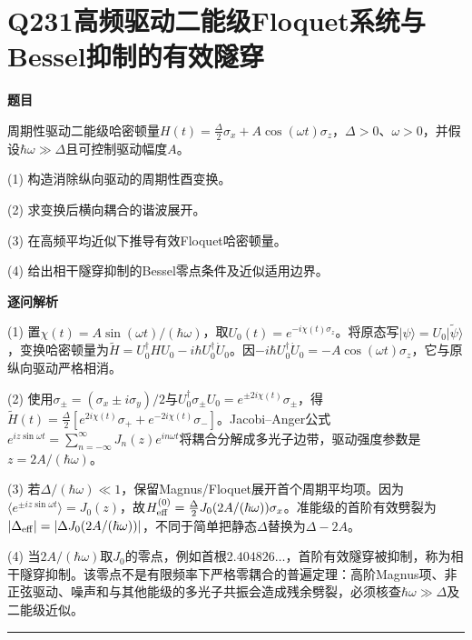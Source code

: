 \documentclass[UTF8,a4paper,11pt,oneside,openany]{ctexbook}
\begin{document}
\section*{Q231\quad 高频驱动二能级Floquet系统与Bessel抑制的有效隧穿}
\textbf{题目}\par
周期性驱动二能级哈密顿量$H(t)=\frac\Delta2\sigma_x+A\cos(\omega t)\sigma_z$，$\Delta>0$、$\omega>0$，并假设$\hbar\omega\gg\Delta$且可控制驱动幅度$A$。
\par\smallskip\noindent (1) 构造消除纵向驱动的周期性酉变换。
\par\smallskip\noindent (2) 求变换后横向耦合的谐波展开。
\par\smallskip\noindent (3) 在高频平均近似下推导有效Floquet哈密顿量。
\par\smallskip\noindent (4) 给出相干隧穿抑制的Bessel零点条件及近似适用边界。
\par\medskip\textbf{逐问解析}\par
\par\smallskip\noindent (1) 置$\chi(t)=A\sin(\omega t)/(\hbar\omega)$，取$U_0(t)=e^{-i\chi(t)\sigma_z}$。将原态写$|\psi\rangle=U_0|\widetilde\psi\rangle$，变换哈密顿量为$\widetilde H=U_0^\dagger HU_0-i\hbar U_0^\dagger\dot U_0$。因$-i\hbar U_0^\dagger\dot U_0=-A\cos(\omega t)\sigma_z$，它与原纵向驱动严格相消。
\par\smallskip\noindent (2) 使用$\sigma_\pm=(\sigma_x\pm i\sigma_y)/2$与$U_0^\dagger\sigma_\pm U_0=e^{\pm 2i\chi(t)}\sigma_\pm$，得$\widetilde H(t)=\frac\Delta2[e^{2i\chi(t)}\sigma_++e^{-2i\chi(t)}\sigma_-]$。Jacobi–Anger公式$e^{iz\sin\omega t}=\sum_{n=-\infty}^\infty J_n(z)e^{in\omega t}$将耦合分解成多光子边带，驱动强度参数是$z=2A/(\hbar\omega)$。
\par\smallskip\noindent (3) 若$\Delta/(\hbar\omega)\ll1$，保留Magnus/Floquet展开首个周期平均项。因为$\langle e^{\pm iz\sin\omega t}\rangle=J_0(z)$，故$H_{\rm eff}^{(0)}=\frac\Delta2J_0(2A/(\hbar\omega))\sigma_x$。准能级的首阶有效劈裂为$|\Delta_{\rm eff}|=|\Delta J_0(2A/(\hbar\omega))|$，不同于简单把静态$\Delta$替换为$\Delta-2A$。
\par\smallskip\noindent (4) 当$2A/(\hbar\omega)$取$J_0$的零点，例如首根$2.404826\ldots$，首阶有效隧穿被抑制，称为相干隧穿抑制。该零点不是有限频率下严格零耦合的普遍定理：高阶Magnus项、非正弦驱动、噪声和与其他能级的多光子共振会造成残余劈裂，必须核查$\hbar\omega\gg\Delta$及二能级近似。
\par\medskip\hrule\medskip
\end{document}
